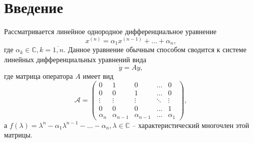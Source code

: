 \section{Введение}
Рассматривается линейное однородное дифференциальное уравнение
$$
	x^{(n)} = \alpha_{1}x^{(n-1)} + \ldots + \alpha_{n}, 
$$
где $\alpha_{k} \in \mathbb{C}, k = \overline{1,n}$. Данное уравнение обычным способом сводится к системе
линейных дифференциальных уравнений вида
$$
	\dot{y} = Ay,
$$
где матрица оператора $A$ имеет вид
$$
	\mathcal{A} = \begin{pmatrix}
		0 & 1 & 0 & \dots & 0 \\
		0 & 0 & 1 & \dots & 0 \\
		\vdots & \vdots & \vdots & \ddots & \vdots \\
		0 & 0 & 0 & \dots & 1 \\
		\alpha_n & \alpha_{n-1} & \alpha_{n-1} & \dots & \alpha_1
	\end{pmatrix},
$$
а $f(\lambda) = \lambda^{n} - \alpha_{1}\lambda^{n-1} - \ldots - \alpha_{n}, \lambda \in \mathbb{C}$ -- характеристический многочлен этой матрицы.